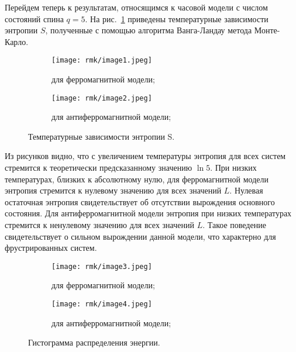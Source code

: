 %
%

Перейдем теперь к результатам, относящимся к часовой модели с числом состояний спина $q = 5$. На рис.~\ref{fig:rmk-1} приведены температурные зависимости энтропии $S$, полученные с помощью алгоритма Ванга-Ландау метода Монте-Карло.

\begin{figure}[ht]
    \centering
    \begin{subfigure}{0.45\textwidth}
        \texttt{[image: rmk/image1.jpeg]}
        \caption{для ферромагнитной модели;}
    \end{subfigure}
    \begin{subfigure}{0.45\textwidth}
        \texttt{[image: rmk/image2.jpeg]}
        \caption{для антиферромагнитной модели;}
    \end{subfigure}
    \caption{Температурные зависимости энтропии S.}
    \label{fig:rmk-1}
\end{figure}

Из рисунков видно, что с увеличением температуры энтропия для всех систем стремится к теоретически предсказанному значению $\ln 5$. При низких температурах, близких к абсолютному нулю, для ферромагнитной модели энтропия стремится к нулевому значению для всех значений $L$. Нулевая остаточная энтропия свидетельствует об отсутствии вырождения основного состояния. Для антиферромагнитной модели энтропия при низких температурах стремится к ненулевому значению для всех значений $L$. Такое поведение свидетельствует о сильном вырождении данной модели, что характерно для фрустрированных систем.

\begin{figure}[ht]
    \centering
    \begin{subfigure}{0.45\textwidth}
        \texttt{[image: rmk/image3.jpeg]}
        \caption{для ферромагнитной модели;}
        \label{fig:rmk-2:a}
    \end{subfigure}
    \begin{subfigure}{0.45\textwidth}
        \texttt{[image: rmk/image4.jpeg]}
        \caption{для антиферромагнитной модели;}
        \label{fig:rmk-2:b}
    \end{subfigure}
    \caption{Гистограмма распределения энергии.}
    \label{fig:rmk-2}
\end{figure}

